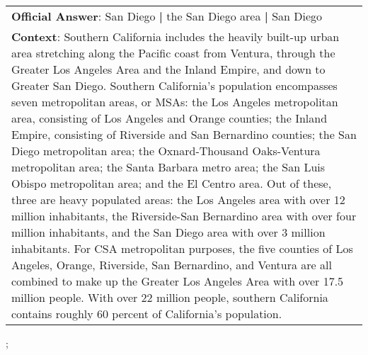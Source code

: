 \begin{figure*}[ht]
{\begin{tabular}{p{}}
            \textbf{Official Answer}: San Diego \textbf{|} the San Diego area \textbf{|} San Diego                                                                                                                                                                                                                                                                                                                                                                                                                                                                                                                                                                                                                                                                                                                                                                                                                                                                                                                                                                                                                                                                                                                      \\
            \textbf{Context}: Southern California includes the heavily built-up urban area stretching along the Pacific coast from Ventura, through the Greater Los Angeles Area and the Inland Empire, and down to Greater San Diego. Southern California's population encompasses seven metropolitan areas, or MSAs: the Los Angeles metropolitan area, consisting of Los Angeles and Orange counties; the Inland Empire, consisting of Riverside and San Bernardino counties; the San Diego metropolitan area; the Oxnard-Thousand Oaks-Ventura metropolitan area; the Santa Barbara metro area; the San Luis Obispo metropolitan area; and the El Centro area. Out of these, three are heavy populated areas: the Los Angeles area with over 12 million inhabitants, the Riverside-San Bernardino area with over four million inhabitants, and the San Diego area with over 3 million inhabitants. For CSA metropolitan purposes, the five counties of Los Angeles, Orange, Riverside, San Bernardino, and Ventura are all combined to make up the Greater Los Angeles Area with over 17.5 million people. With over 22 million people, southern California contains roughly 60 percent of California's population. \\
        \end{tabular}
    };
    \label{fig:ex-5705e3f252bb89140068966d}
\end{figure*}

